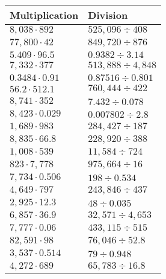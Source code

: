 \begin{longtable}[]{@{}ll@{}}
\toprule
Multiplication & Division\tabularnewline
\midrule
\endhead
\(8,038\cdot892\) & \(525,096÷408\)\tabularnewline
\(77,800\cdot42\) & \(849,720÷876\)\tabularnewline
\(5.409\cdot96.5\) & \(0.9382÷3.14\)\tabularnewline
\(7,332\cdot377\) & \(513,888÷4,848\)\tabularnewline
\(0.3484\cdot0.91\) & \(0.87516÷0.801\)\tabularnewline
\(56.2\cdot512.1\) & \(760,444÷422\)\tabularnewline
\(8,741\cdot352\) & \(7.432÷0.078\)\tabularnewline
\(8,423\cdot0.029\) & \(0.007802 ÷2.8\)\tabularnewline
\(1,689\cdot983\) & \(284,427÷187\)\tabularnewline
\(8,835\cdot66.8\) & \(228,920÷388\)\tabularnewline
\(1,008\cdot539\) & \(11,584÷724\)\tabularnewline
\(823\cdot7,778\) & \(975,664÷16\)\tabularnewline
\(7,734\cdot0.506\) & \(198÷0.534\)\tabularnewline
\(4,649\cdot797\) & \(243,846÷437\)\tabularnewline
\(2,925\cdot12.3\) & \(48÷0.035\)\tabularnewline
\(6,857\cdot36.9\) & \(32,571÷4,653\)\tabularnewline
\(7,777\cdot0.06\) & \(433,115÷515\)\tabularnewline
\(82,591\cdot98\) & \(76,046÷52.8\)\tabularnewline
\(3,537\cdot0.514\) & \(79÷0.948\)\tabularnewline
\(4,272\cdot689\) & \(65,783÷16.8\)\tabularnewline
\bottomrule
\end{longtable}
